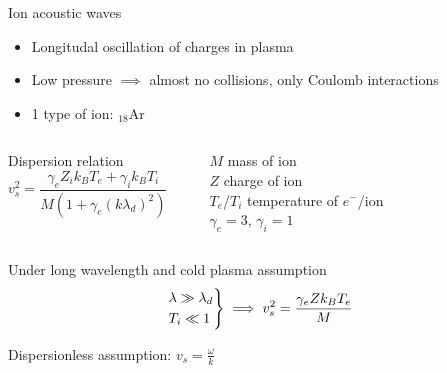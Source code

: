 \documentclass[10pt]{beamer}
\newcommand{\electron}[0]{$e^{-}$}
\begin{document}
\begin{frame}{Ion acoustic waves}
    \begin{itemize}
        \item Longitudal oscillation of charges in plasma
        \item Low pressure $\implies$ almost no collisions, only Coulomb interactions
        \item 1 type of ion: $_{18}$Ar
    \end{itemize}
    
    \vspace{0.5cm}
    \begin{columns}[T]
        Dispersion relation \space {}
        \begin{equation*}
            v_s^2 = \frac{\gamma_e Z_i k_B T_e + \gamma_i k_B T_i}{M(1+\gamma_e(k\lambda_d)^2)}
        \end{equation*}
        
        \rule{.1mm}{1.5cm}

        \vfill
        \centering
        $M$ mass of ion \\
        $Z$ charge of ion \\
        $T_e$/$T_i$ temperature of \electron/ion \\
        $\gamma_e=3$, $\gamma_i=1$
        \vfill
    \end{columns}

    \vspace{0.8cm}
    Under long wavelength and cold plasma assumption
    \begin{equation*}
        \begin{rcases}
            \lambda \gg \lambda_d \\
            T_i \ll 1
        \end{rcases}
        \implies v_s^2 = \frac{\gamma_e Z k_B T_e}{M}
    \end{equation*}

    Dispersionless assumption: $v_s = \frac{\omega}{k}$
\end{frame}
\end{document}
